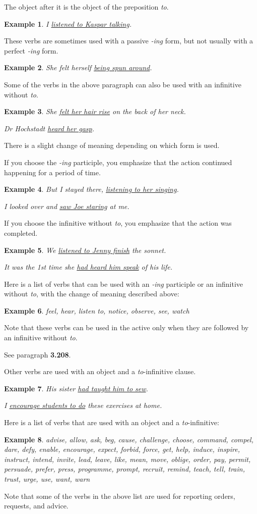 \documentclass[oneside]{book}
\numberwithin{equation}{section}
\newtheorem{example}{Example}[section]
\begin{document}
The object after it is the object of the preposition \textit{to}.
\begin{example}
    I \underline{listened to Kaspar talking}.
\end{example}
These verbs are sometimes used with a passive \textit{-ing} form, but not usually with a perfect \textit{-ing} form.
\begin{example}
    She felt herself \underline{being spun around}.
\end{example}
%
\noindent{} Some of the verbs in the above paragraph can also be used with an infinitive without \textit{to}.
\begin{example}
    She \underline{felt her hair rise} on the back of her neck.
    
    Dr Hochstadt \underline{heard her gasp}.
\end{example}
There is a slight change of meaning depending on which form is used.

If you choose the \textit{-ing} participle, you emphasize that the action continued happening for a period of time.
\begin{example}
    But I stayed there, \underline{listening to her singing}.
    
    I looked over and \underline{saw Joe staring} at me.
\end{example}
If you choose the infinitive without \textit{to}, you emphasize that the action was completed.
\begin{example}
    We \underline{listened to Jenny finish} the sonnet.
    
    It was the 1st time she \underline{had heard him speak} of his life.
\end{example}
Here is a list of verbs that can be used with an \textit{-ing} participle or an infinitive without \textit{to}, with the change of meaning described above:
\begin{example}
    feel, hear, listen to, notice, observe, see, watch
\end{example}
Note that these verbs can be used in the active only when they are followed by an infinitive without \textit{to}.

See paragraph \textbf{3.208}.

%
\noindent{} Other verbs are used with an object and a \textit{to}-infinitive clause.
\begin{example}
    His sister \underline{had taught him to sew}.
    
    I \underline{encourage students to do} these exercises at home.
\end{example}
Here is a list of verbs that are used with an object and a \textit{to}-infinitive:
\begin{example}
    advise, allow, ask, beg, cause, challenge, choose, command, compel, dare, defy, enable, encourage, expect, forbid, force, get, help, induce, inspire, instruct, intend, invite, lead, leave, like, mean, move, oblige, order, pay, permit, persuade, prefer, press, programme, prompt, recruit, remind, teach, tell, train, trust, urge, use, want, warn
\end{example}
Note that some of the verbs in the above list are used for reporting orders, requests, and advice.
\end{document}
